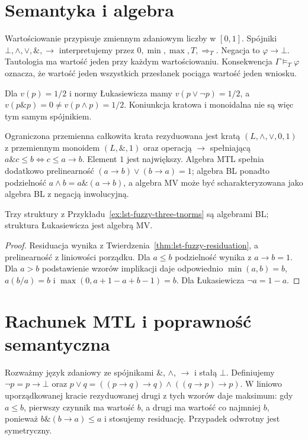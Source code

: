 \section{Semantyka i algebra}
Wartościowanie przypisuje zmiennym zdaniowym liczby w $[0,1]$.
Spójniki $\bot,\wedge,\vee,\mathbin{\&},\to$ interpretujemy przez
$0,\min,\max,T,\Rightarrow_T$. Negacja to $\varphi\to\bot$.
Tautologia ma wartość jeden przy każdym wartościowaniu.
Konsekwencja $\Gamma\models_T\varphi$ oznacza, że wartość jeden
wszystkich przesłanek pociąga wartość jeden wniosku.
\begin{przyklad}
Dla $v(p)=1/2$ i normy Łukasiewicza mamy $v(p\vee\neg p)=1/2$,
a $v(p\mathbin{\&}p)=0\ne v(p\wedge p)=1/2$.
Koniunkcja kratowa i monoidalna nie są więc tym samym spójnikiem.
\end{przyklad}
\begin{definicja}\label{def:lst-fuzzy-residuated-lattice}
Ograniczona przemienna całkowita krata rezyduowana jest kratą
$(L,\wedge,\vee,0,1)$ z przemiennym monoidem $(L,\mathbin{\&},1)$
oraz operacją $\to$ spełniającą
$a\mathbin{\&}c\leq b\iff c\leq a\to b$. Element $1$ jest największy.
Algebra MTL spełnia dodatkowo prelinearność
$(a\to b)\vee(b\to a)=1$; algebra BL ponadto podzielność
$a\wedge b=a\mathbin{\&}(a\to b)$, a algebra MV może być
scharakteryzowana jako algebra BL z negacją inwolucyjną.
\end{definicja}
\begin{stwierdzenie}
Trzy struktury z Przykładu~\ref{ex:lst-fuzzy-three-tnorms}
są algebrami BL; struktura Łukasiewicza jest algebrą MV.
\end{stwierdzenie}
\begin{proof}
Residuacja wynika z Twierdzenia~\ref{thm:lst-fuzzy-residuation},
a prelinearność z liniowości porządku. Dla $a\leq b$
podzielność wynika z $a\to b=1$. Dla $a>b$ podstawienie wzorów
implikacji daje odpowiednio $\min(a,b)=b$, $a(b/a)=b$ i
$\max(0,a+1-a+b-1)=b$. Dla Łukasiewicza $\neg a=1-a$.
\end{proof}

\section{Rachunek MTL i poprawność semantyczna}
Rozważmy język zdaniowy ze spójnikami $\mathbin{\&}$, $\wedge$,
$\to$ i stałą $\bot$. Definiujemy $\neg p=p\to\bot$ oraz
$p\vee q=((p\to q)\to q)\wedge((q\to p)\to p)$.
W liniowo uporządkowanej kracie rezyduowanej drugi z tych wzorów
daje maksimum: gdy $a\leq b$, pierwszy czynnik ma wartość $b$,
a drugi ma wartość co najmniej $b$, ponieważ
$b\mathbin{\&}(b\to a)\leq a$ i stosujemy residuację. Przypadek odwrotny jest symetryczny.

